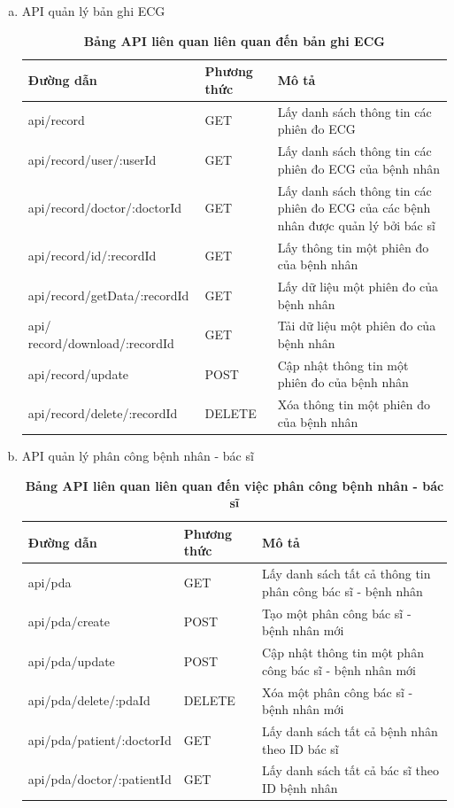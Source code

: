 \begin{enumerate}[a)]
\item API quản lý bản ghi ECG
\begin{xltabular}{\textwidth}{
  | >{\raggedright\arraybackslash}p{5cm}
  | >{\centering\arraybackslash}m{2.8cm}
  | >{\raggedright\arraybackslash}X |
  }
  \caption{\bfseries \fontsize{12pt}{0pt}\selectfont Bảng API liên quan liên quan đến bản ghi ECG}
  \label{table_api_ecg}
  \\
  \hline
  \bfseries Đường dẫn    &\bfseries Phương thức    &\bfseries Mô tả\\ \hline
 api/record   &   GET  & Lấy danh sách thông tin các phiên đo ECG \\ \hline
 api/record/user/:userId   &    GET    & Lấy danh sách thông tin các phiên đo ECG của bệnh nhân \\ \hline
 api/record/doctor/:doctorId &   GET     & Lấy danh sách thông tin các phiên đo ECG của các bệnh nhân được quản lý bởi bác sĩ \\ \hline
 api/record/id/:recordId  &     GET   & Lấy thông tin một phiên đo của bệnh nhân \\ \hline
 api/record/getData/:recordId  &     GET   & Lấy dữ liệu một phiên đo của bệnh nhân \\ \hline
 api/ record/download/:recordId  &     GET   & Tải dữ liệu một phiên đo của bệnh nhân \\ \hline
 api/record/update  &     POST   & Cập nhật thông tin một phiên đo của bệnh nhân \\ \hline
 api/record/delete/:recordId  &     DELETE   & Xóa thông tin một phiên đo của bệnh nhân \\ \hline
  \end{xltabular}


\item API quản lý phân công bệnh nhân - bác sĩ
\begin{xltabular}{\textwidth}{
  | >{\raggedright\arraybackslash}p{4.5cm}
  | >{\centering\arraybackslash}m{2.8cm}
  | >{\raggedright\arraybackslash}X |
  }
  \caption{\bfseries \fontsize{12pt}{0pt}\selectfont Bảng API liên quan liên quan đến việc phân công bệnh nhân - bác sĩ}
  \label{table_api_pda}
  \\
  \hline
  \bfseries Đường dẫn    &\bfseries Phương thức    &\bfseries Mô tả\\ \hline
  api/pda   &   GET  & Lấy danh sách tất cả thông tin phân công bác sĩ - bệnh nhân \\ \hline
  api/pda/create  &    POST    & Tạo một phân công bác sĩ - bệnh nhân mới \\ \hline
  api/pda/update  &    POST    & Cập nhật thông tin một phân công bác sĩ - bệnh nhân mới \\ \hline
  api/pda/delete/:pdaId  &    DELETE    & Xóa một phân công bác sĩ - bệnh nhân mới \\ \hline
  api/pda/patient/:doctorId &  GET  & Lấy danh sách tất cả bệnh nhân theo ID bác sĩ \\ \hline
  api/pda/doctor/:patientId &  GET  & Lấy danh sách tất cả bác sĩ theo ID bệnh nhân \\ \hline
  \end{xltabular}

\end{enumerate}
